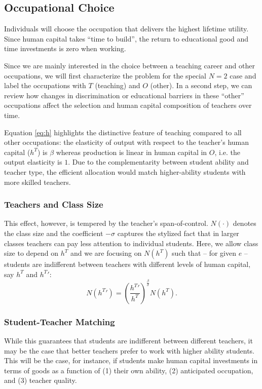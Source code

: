 \documentclass[onehalfspacing,11pt]{article}
\begin{document}
\subsection{Occupational Choice}

Individuals will choose the occupation that delivers the highest lifetime utility. Since human capital takes ``time to build'', the return to educational good and time investments is zero when working.%

Since we are mainly interested in the choice between a teaching career and other occupations, we will first characterize the problem for the special $N=2$ case and label the occupations with $T$ (teaching) and $O$ (other). In a second step, we can review how changes in discrimination or educational barriers in these ``other'' occupations affect the selection and human capital composition of teachers over time.

Equation \eqref{eq:h} highlights the distinctive feature of teaching compared to all other occupations: the elasticity of output with respect to the teacher's human capital ($h^T$) is $\beta$ whereas production is linear in human capital in $O$, i.e. the output elasticity is $1$. Due to the complementarity between student ability and teacher type, the efficient allocation would match higher-ability students with more skilled teachers.
\subsubsection{Teachers and Class Size}
 This effect, however, is tempered by the teacher's span-of-control. $N(\cdot)$ denotes the class size and the coefficient $-\sigma$ captures the stylized fact that in larger classes teachers can pay less attention to individual students. Here, we allow class size to depend on $h^T$ and we are focusing on $N(h^T)$ such that -- for given $e$ -- students are indifferent between teachers with different levels of human capital, say $h^T$ and ${h^T}'$:
 \begin{equation}
\label{ }
N({h^T}') = \left(\frac{{h^T}'}{{h^T}}\right)^{\frac{\beta}{\sigma}} N({h^T}).
\end{equation}
\subsubsection{Student-Teacher Matching}
While this guarantees that students are indifferent between different teachers, it may be the case that better teachers prefer to work with higher ability students. This will be the case, for instance, if students make human capital investments in terms of goods as a function of (1) their own ability, (2) anticipated occupation, and (3) teacher quality. 
\end{document}
